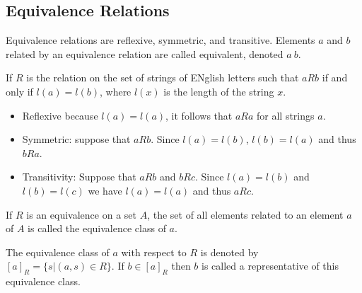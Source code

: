 \subsection{Equivalence Relations}
Equivalence relations are reflexive, symmetric, and transitive. Elements \(a\) and \(b\) related by an equivalence relation are called equivalent, denoted \(a ~ b\).

\begin{example}
    If \(R\) is the relation on the set of strings of ENglish letters such that \(a R b\) if and only if \(l(a) = l(b)\), where \(l(x)\) is the length of the string \(x\).
    \begin{itemize}
        \item Reflexive because \(l(a) = l(a)\), it follows that \(a R a\) for all strings \(a\).
        \item Symmetric: suppose that \(a R b\). Since \(l(a) = l(b)\), \(l(b) = l(a)\) and thus \(b R a\).
        \item Transitivity: Suppose that \(a R b\) and \(b R c\). Since \(l(a) = l(b)\) and
              \(l(b) = l(c)\) we have \(l(a) = l(a)\) and thus \(a R c\).
    \end{itemize}
\end{example}
If \(R\) is an equivalence on a set \(A\), the set of all elements related to an element \(a\) of \(A\) is called the equivalence class of \(a\).

The equivalence class of \(a\) with respect to \(R\) is denoted by \([a]_R = \{s | (a, s) \in R\}\). If \(b \in [a]_R\) then \(b\) is called a representative of this equivalence class.
